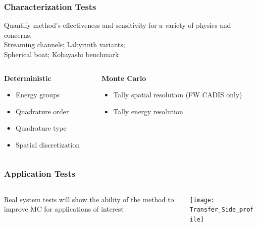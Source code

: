 \documentclass[handout]{beamer}
\renewcommand{\(}{\begin{columns}}
\renewcommand{\)}{\end{columns}}
\newcommand{\<}[1]{\begin{column}{#1}}
\renewcommand{\>}{\end{column}}
\begin{document}
\begin{frame}[fragile]

  \frametitle{Characterization Tests}
   Quantify method's effectiveness and sensitivity for a variety of physics and concerns: \\
   \vspace*{.5 em}
    Streaming channels; \hspace*{2 em} Labyrinth variants;\\
    Spherical boat; \hspace*{4.25 em} Kobayashi benchmark
    \vspace{1 em}
    
    \begin{columns}
    \begin{column}{0.45\textwidth}
    \textbf{Deterministic}
    \begin{itemize}
    \item Energy groups 
    \item Quadrature order
    \item Quadrature type
    \item Spatial discretization
    \end{itemize}
    \end{column}
    
    \begin{column}{0.55\textwidth}
    \textbf{Monte Carlo}
    \begin{itemize}
    \item Tally spatial resolution (FW CADIS only)
    \item Tally energy resolution 
    \end{itemize}
    \end{column}
  \end{columns}

\end{frame}


\begin{frame}[fragile]

  \frametitle{Application Tests}
  
    \begin{columns}
    \begin{column}{0.55\textwidth}
Real system tests will show the ability of the method to improve MC for applications of interest
    \end{column}    
    \begin{column}{0.45\textwidth}
  \begin{center}
  \texttt{[image: Transfer\_Side\_profile]}  
  \end{center}
    \end{column}
  \end{columns}   

\end{frame}
\end{document}
